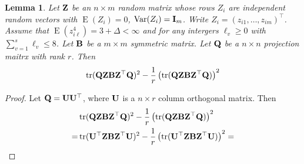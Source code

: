 \documentclass[11pt]{article}
\DeclareMathOperator{\mytr}{tr}
\DeclareMathOperator{\myE}{E}
\DeclareMathOperator{\myVar}{Var}
\theoremstyle{plain}
\newtheorem{lemma}{\quad\quad Lemma}
\theoremstyle{definition}
\theoremstyle{remark}
\begin{document}
\begin{lemma}
    Let $\mathbf{Z}$ be an $n\times m$ random matrix whose rows $Z_i$ are independent random vectors with $\myE (Z_i)=0$, $\myVar (Z_i)= \BI_m$.
    Write $Z_i=(z_{i1},\ldots,z_{im})^\top$.
    Assume that $\myE (z_{i\ell}^4)=3 + \Delta <\infty$ and for any intergers $\ell_v \geq 0$ with $\sum_{v=1}^s \ell_v \leq 8$.
    Let $\mathbf{B}$ be a $m\times m$ symmetric matrix.
    Let $\mathbf{Q}$ be a $n\times n$ projection maitrx with rank $r$.
    Then
    \begin{equation*}
    \mytr(\BQ \BZ \BB \BZ^\top \BQ)^2 - 
    \frac{1}{r}
    \left( \mytr(\BQ \BZ \BB \BZ^\top \BQ)\right)^2
    \end{equation*}
\end{lemma}
\begin{proof}


Let $\mathbf{Q}=\mathbf{U}\mathbf{U}^\top$, where $\mathbf{U}$ is a $n\times r$ column orthogonal matrix.
Then
\begin{equation*}
    \begin{split}
&\mytr(\BQ \BZ \BB \BZ^\top \BQ)^2 - 
\frac{1}{r}
\left( \mytr(\BQ \BZ \BB \BZ^\top \BQ)\right)^2
\\
 =       
&\mytr(\BU^\top \BZ \BB \BZ^\top \BU)^2 - 
\frac{1}{r}
\left( \mytr(\BU^\top \BZ \BB \BZ^\top \BU)\right)^2
=
    \end{split}
\end{equation*}



\end{proof}
\end{document}
